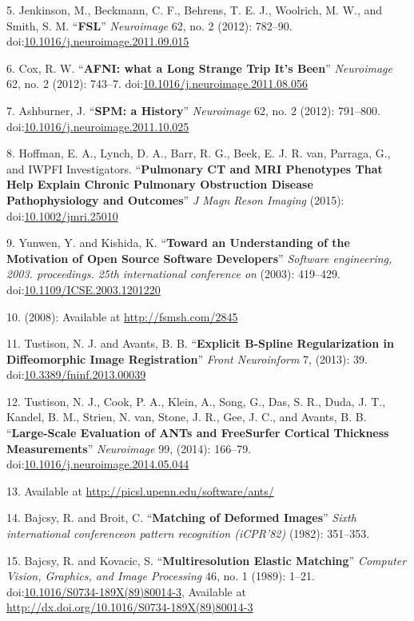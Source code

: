 \documentclass[11pt,]{article}
\begin{document}
5. Jenkinson, M., Beckmann, C. F., Behrens, T. E. J., Woolrich, M. W.,
and Smith, S. M. ``\textbf{FSL}'' \emph{Neuroimage} 62, no. 2 (2012):
782--90.
doi:\href{http://dx.doi.org/10.1016/j.neuroimage.2011.09.015}{10.1016/j.neuroimage.2011.09.015}

6. Cox, R. W. ``\textbf{AFNI: what a Long Strange Trip It's Been}''
\emph{Neuroimage} 62, no. 2 (2012): 743--7.
doi:\href{http://dx.doi.org/10.1016/j.neuroimage.2011.08.056}{10.1016/j.neuroimage.2011.08.056}

7. Ashburner, J. ``\textbf{SPM: a History}'' \emph{Neuroimage} 62, no. 2
(2012): 791--800.
doi:\href{http://dx.doi.org/10.1016/j.neuroimage.2011.10.025}{10.1016/j.neuroimage.2011.10.025}

8. Hoffman, E. A., Lynch, D. A., Barr, R. G., Beek, E. J. R. van,
Parraga, G., and IWPFI Investigators. ``\textbf{Pulmonary CT and MRI
Phenotypes That Help Explain Chronic Pulmonary Obstruction Disease
Pathophysiology and Outcomes}'' \emph{J Magn Reson Imaging} (2015):
doi:\href{http://dx.doi.org/10.1002/jmri.25010}{10.1002/jmri.25010}

9. Yunwen, Y. and Kishida, K. ``\textbf{Toward an Understanding of the
Motivation of Open Source Software Developers}'' \emph{Software
engineering, 2003. proceedings. 25th international conference on}
(2003): 419--429.
doi:\href{http://dx.doi.org/10.1109/ICSE.2003.1201220}{10.1109/ICSE.2003.1201220}

10. (2008): Available at \url{http://fsmsh.com/2845}

11. Tustison, N. J. and Avants, B. B. ``\textbf{Explicit B-Spline
Regularization in Diffeomorphic Image Registration}'' \emph{Front
Neuroinform} 7, (2013): 39.
doi:\href{http://dx.doi.org/10.3389/fninf.2013.00039}{10.3389/fninf.2013.00039}

12. Tustison, N. J., Cook, P. A., Klein, A., Song, G., Das, S. R., Duda,
J. T., Kandel, B. M., Strien, N. van, Stone, J. R., Gee, J. C., and
Avants, B. B. ``\textbf{Large-Scale Evaluation of ANTs and FreeSurfer
Cortical Thickness Measurements}'' \emph{Neuroimage} 99, (2014):
166--79.
doi:\href{http://dx.doi.org/10.1016/j.neuroimage.2014.05.044}{10.1016/j.neuroimage.2014.05.044}

13. Available at \url{http://picsl.upenn.edu/software/ants/}

14. Bajcsy, R. and Broit, C. ``\textbf{Matching of Deformed Images}''
\emph{Sixth international conferenceon pattern recognition (iCPR'82)}
(1982): 351--353.

15. Bajcsy, R. and Kovacic, S. ``\textbf{Multiresolution Elastic
Matching}'' \emph{Computer Vision, Graphics, and Image Processing} 46,
no. 1 (1989): 1--21.
doi:\href{http://dx.doi.org/10.1016/S0734-189X(89)80014-3}{10.1016/S0734-189X(89)80014-3},
Available at \url{http://dx.doi.org/10.1016/S0734-189X(89)80014-3}
\end{document}
